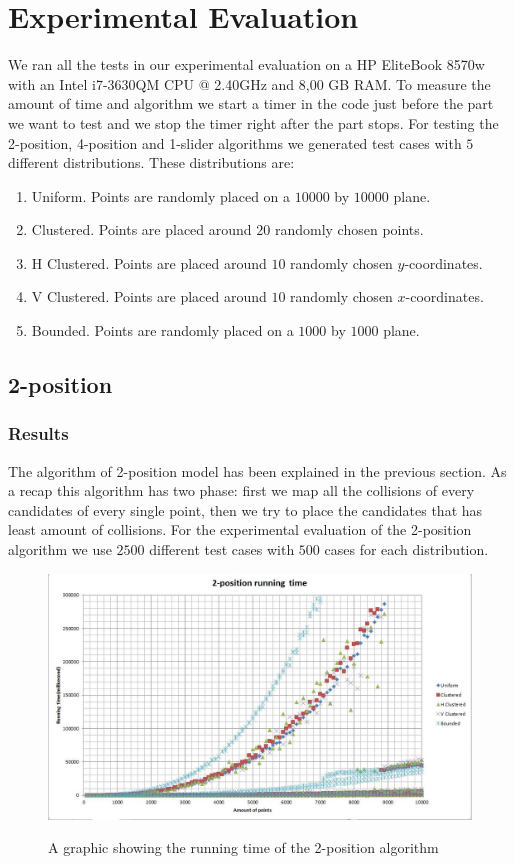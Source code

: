 \documentclass[crop=false,a4paper,oneside,11pt]{standalone}
\begin{document}
\section{Experimental Evaluation}

We ran all the tests in our experimental evaluation on a HP EliteBook 8570w with an Intel i7-3630QM CPU @ 2.40GHz and 8,00 GB RAM. To measure the amount of time and algorithm we start a timer in the code just before the part we want to test and we stop the timer right after the part stops. For testing the 2-position, 4-position and 1-slider algorithms we generated test cases with $5$ different distributions. These distributions are:
\begin{enumerate}
    \item Uniform. Points are randomly placed on a $10000$ by $10000$ plane.
    \item Clustered. Points are placed around $20$ randomly chosen points.
    \item H Clustered. Points are placed around $10$ randomly chosen $y$-coordinates.
    \item V Clustered. Points are placed around $10$ randomly chosen $x$-coordinates.
    \item Bounded. Points are randomly placed on a $1000$ by $1000$ plane.
\end{enumerate}

\subsection{2-position}
\subsubsection{Results}
The algorithm of 2-position model has been explained in the previous section. As a recap this algorithm has two phase: first we map all the collisions of every candidates of every single point, then we try to place the candidates that has least amount of collisions. For the experimental evaluation of the 2-position algorithm we use $2500$ different test cases with $500$ cases for each distribution.

\begin{figure}[h!]
 \centering
  \includegraphics[scale = 0.5]{2PosRunningTime.JPG}\\
  \caption{A graphic showing the running time of the 2-position algorithm}
 \end{figure}
\end{document}
